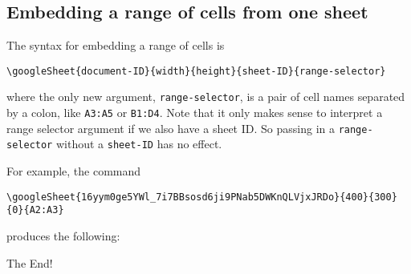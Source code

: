 \documentclass{ximera}
\begin{document}
 
 
\subsection{Embedding a range of cells from one sheet}
 
The syntax for embedding a range of cells is
\begin{verbatim}
\googleSheet{document-ID}{width}{height}{sheet-ID}{range-selector}
\end{verbatim}
where the only new argument, \texttt{range-selector}, is a pair of cell names separated by a colon, like \texttt{A3:A5} or \texttt{B1:D4}. Note that it only makes sense to interpret a range selector argument if we also have a sheet ID. So passing in a \texttt{range-selector} without a \texttt{sheet-ID} has no effect.
 
For example, the command
\begin{verbatim}
\googleSheet{16yym0ge5YWl_7i7BBsosd6ji9PNab5DWKnQLVjxJRDo}{400}{300}{0}{A2:A3}
\end{verbatim}
produces the following:
 
 
The End!
 
\end{document}
